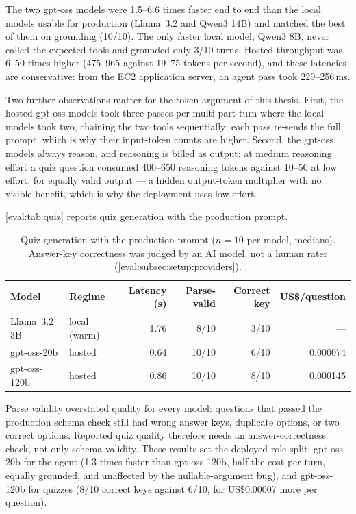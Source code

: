 The two gpt-oss models were 1.5--6.6 times faster end to end than the local
models usable for production (Llama~3.2 and Qwen3 14B) and matched the best
of them on grounding (10/10). The only faster local model, Qwen3 8B, never
called the expected tools and grounded only 3/10 turns. Hosted throughput was 6--50 times
higher (475--965 against 19--75 tokens per second), and these latencies are
conservative: from the EC2 application server, an agent pass took
229--256\,ms.

Two further observations matter for the token argument of this thesis.
First, the hosted gpt-oss models took three passes per multi-part turn where
the local models took two, chaining the two tools sequentially; each pass
re-sends the full prompt, which is why their input-token counts are higher.
Second, the gpt-oss models always reason, and reasoning is billed as output:
at medium reasoning effort a quiz question consumed 400--650 reasoning tokens
against 10--50 at low effort, for equally valid output --- a hidden
output-token multiplier with no visible benefit, which is why the deployment
uses low effort.

\autoref{eval:tab:quiz} reports quiz generation with the production prompt.

\begin{table}[htb]
  \centering
  \caption{Quiz generation with the production prompt ($n=10$ per model,
           medians). Answer-key correctness was judged by an AI model, not a
           human rater (\autoref{eval:subsec:setup:providers}).}
  \label{eval:tab:quiz}
  \footnotesize
  \begin{tabular}{l l r r r r}
    \hline
    \textbf{Model} & \textbf{Regime} & \textbf{Latency (s)} & \textbf{Parse-valid}
      & \textbf{Correct key} & \textbf{US\$/question} \\
    \hline
    Llama~3.2 3B  & local (warm) & 1.76 & 8/10  & 3/10 & --- \\
    gpt-oss-20b   & hosted       & 0.64 & 10/10 & 6/10 & 0.000074 \\
    gpt-oss-120b  & hosted       & 0.86 & 10/10 & 8/10 & 0.000145 \\
    \hline
  \end{tabular}
\end{table}

Parse validity overstated quality for every model: questions that passed
the production schema check still had wrong answer keys, duplicate options,
or two correct options. Reported quiz quality therefore needs an
answer-correctness check, not only schema validity. These results set the
deployed role split: gpt-oss-20b for the agent (1.3 times faster than
gpt-oss-120b, half the cost per turn, equally grounded, and unaffected by the
nullable-argument bug), and gpt-oss-120b for quizzes (8/10 correct keys
against 6/10, for US\$0.00007 more per question).

